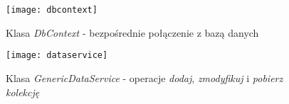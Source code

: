 \begin{figure}[H]
	\centering
	\texttt{[image: dbcontext]}
	\caption{Klasa \textit{DbContext} - bezpośrednie połączenie z bazą danych}
	\label{rys:dbcontext}
\end{figure}

\begin{figure}[H]
	\centering
	\texttt{[image: dataservice]}
	\caption{Klasa \textit{GenericDataService} - operacje \textit{dodaj}, \textit{zmodyfikuj} i \textit{pobierz kolekcję}}
	\label{rys:dataservice}
\end{figure}
